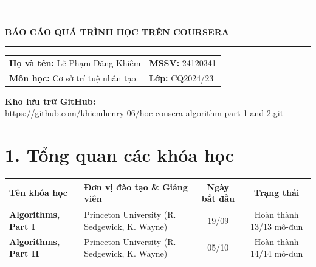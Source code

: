 \documentclass[11pt, a4paper]{article}
\begin{document}
\begin{center}
    {\color{primary}\rule{\textwidth}{1.6pt}}\\[0.35cm]
    {\LARGE\bfseries\color{primary} BÁO CÁO QUÁ TRÌNH HỌC TRÊN COURSERA}\\[0.3cm]
    {\color{primary}\rule{\textwidth}{0.8pt}}
\end{center}

\vspace{0.2cm}

\noindent
\begin{tabularx}{\textwidth}{@{} X X @{}}
    \textbf{Họ và tên:} Lê Phạm Đăng Khiêm & \textbf{MSSV:} 24120341 \\
    \textbf{Môn học:} Cơ sở trí tuệ nhân tạo & \textbf{Lớp:} CQ2024/23 \\
\end{tabularx}

\vspace{0.4cm}

\noindent\textbf{Kho lưu trữ GitHub:}\\[0.1cm]
{\small\url{https://github.com/khiemhenry-06/hoc-cousera-algorithm-part-1-and-2.git}}

\section*{\color{primary}1. Tổng quan các khóa học}
\vspace{-0.1cm}

\noindent
\begin{tabularx}{\textwidth}{@{} l X c c @{}}
    \toprule
    \textbf{Tên khóa học} & \textbf{Đơn vị đào tạo \& Giảng viên} & \textbf{Ngày bắt đầu} & \textbf{Trạng thái} \\
    \midrule
    \textbf{Algorithms, Part I} & Princeton University (R. Sedgewick, K. Wayne) & 19/09 & Hoàn thành 13/13 mô-đun \\
    \textbf{Algorithms, Part II} & Princeton University (R. Sedgewick, K. Wayne) & 05/10 & Hoàn thành 14/14 mô-đun \\
    \bottomrule
\end{tabularx}

\vspace{0.35cm}
\end{document}

